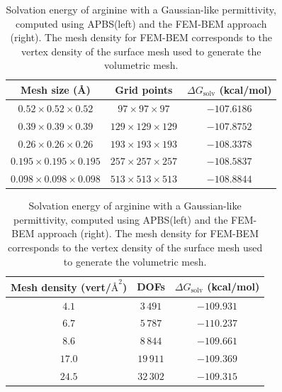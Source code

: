 \begin{table}
\centering
\footnotesize
\begin{tabular}{c|c|c}
Mesh size (\AA)  & Grid points & \parbox{2cm}{\centering$\Delta G_{\text{solv}}$\\(kcal/mol)}\\
\hline
$0.52\times0.52\times0.52$ & $97\times97\times97$ & $-107.6186$\\ 
$0.39\times0.39\times0.39$ & $129\times129\times129$ & $-107.8752$\\ 
$0.26\times0.26\times0.26$ & $193\times193\times193$ & $-108.3378$\\ 
$0.195\times0.195\times0.195$ & $257\times257\times257$ & $-108.5837$\\ 
$0.098\times0.098\times0.098$ & $513\times513\times513$ & $-108.8844$\\ 
\end{tabular}%
\hspace{3mm}%
\begin{tabular}{c|c|c}
\parbox{2.1cm}{\centering Mesh density\\(vert/$\text{\AA}^2$)}& DOFs & \parbox{2cm}{\centering$\Delta G_{\text{solv}}$\\(kcal/mol)}\\
\hline
$4.1$ & $3\,491$ & $-109.931$ \\
$6.7$ & $5\,787$ & $-110.237$ \\
$8.6$ & $8\,844$ & $-109.661$ \\
$17.0$ & $19\,911$ & $-109.369$ \\
$24.5$ & $32\,302$ & $-109.315$ \\
\end{tabular}
\caption{Solvation energy of arginine with a Gaussian-like permittivity, computed using APBS(left) and the FEM-BEM approach (right). The mesh density for FEM-BEM corresponds to the vertex density of the surface mesh used to generate the volumetric mesh.}
\label{table:arg_variable}
\end{table}


